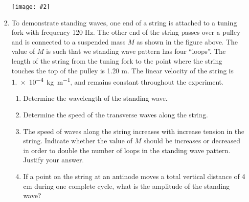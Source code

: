 \documentclass[11pt]{article}
\newcommand{\pic}[2]{
  \begin{center}\texttt{[image: \#2]}\end{center}
}
\begin{document}
\begin{enumerate}[leftmargin=18pt]
  \pic{.8}{tuning-fork}
\item To demonstrate standing waves, one end of a string is attached to a
  tuning fork with frequency 120 Hz. The other end of the string passes over a
  pulley and is connected to a suspended mass $M$ as shown in the figure above.
  The value of $M$ is such that we standing wave pattern has four ``loops''.
  The length of the string from the tuning fork to the point where the string
  touches the top of the pulley is 1.20 m. The linear velocity of the string is
  \SI{1.e-4}{\kilo\gram\per\metre}, and remains constant throughout the
  experiment.
  \begin{enumerate}[leftmargin=18pt]
  \item Determine the wavelength of the standing wave.
  \item Determine the speed of the transverse waves along the string.
    \newpage
  \item The speed of waves along the string increases with increase tension in
    the string. Indicate whether the value of $M$ should be increases or
    decreased in order to double the number of loops in the standing wave
    pattern. Justify your answer.
  \item If a point on the string at an antinode moves a total vertical distance
    of 4 cm during one complete cycle, what is the amplitude of the standing
    wave?
  \end{enumerate}
\end{enumerate}
\end{document}

